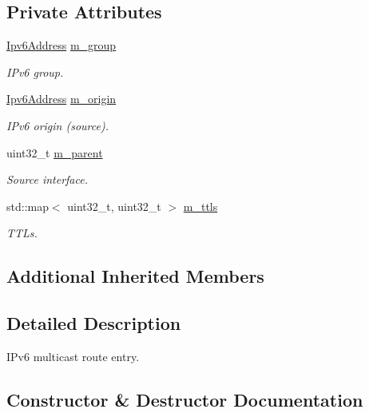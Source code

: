 \subsection*{Private Attributes}
\begin{DoxyCompactItemize}
\item 
\hyperlink{classns3_1_1Ipv6Address}{Ipv6\+Address} \hyperlink{classns3_1_1Ipv6MulticastRoute_a758b8227592ef335ab318f5be88d90b6}{m\+\_\+group}
\begin{DoxyCompactList}\small\item\em I\+Pv6 group. \end{DoxyCompactList}\item 
\hyperlink{classns3_1_1Ipv6Address}{Ipv6\+Address} \hyperlink{classns3_1_1Ipv6MulticastRoute_a2048edca6a4696ddb31e271e65730815}{m\+\_\+origin}
\begin{DoxyCompactList}\small\item\em I\+Pv6 origin (source). \end{DoxyCompactList}\item 
uint32\+\_\+t \hyperlink{classns3_1_1Ipv6MulticastRoute_a8b28b6195ccf29756b67e947bdd7738f}{m\+\_\+parent}
\begin{DoxyCompactList}\small\item\em Source interface. \end{DoxyCompactList}\item 
std\+::map$<$ uint32\+\_\+t, uint32\+\_\+t $>$ \hyperlink{classns3_1_1Ipv6MulticastRoute_aae3361786d8ef8a5c25b2e788c049bae}{m\+\_\+ttls}
\begin{DoxyCompactList}\small\item\em T\+T\+Ls. \end{DoxyCompactList}\end{DoxyCompactItemize}
\subsection*{Additional Inherited Members}


\subsection{Detailed Description}
I\+Pv6 multicast route entry. 

\subsection{Constructor \& Destructor Documentation}
